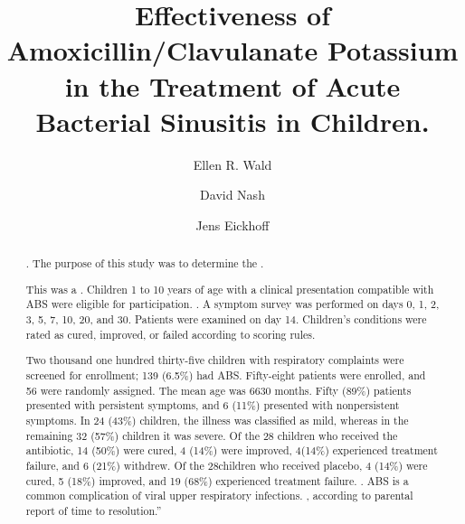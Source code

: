 \documentclass{article}
\title{Effectiveness of Amoxicillin/Clavulanate Potassium in the Treatment of Acute Bacterial Sinusitis in Children.}
\author{Ellen R. Wald \and David Nash \and Jens Eickhoff}
\begin{document}
\maketitle

\begin{abstract}
.
The purpose of this study was to determine the .

This was a .
Children 1 to 10 years of age with a clinical presentation compatible with ABS were eligible for participation.
.
A symptom survey was performed on days 0, 1, 2, 3, 5, 7, 10, 20, and 30.
Patients were examined on day 14.
Children’s conditions were rated as cured, improved, or failed according to scoring rules.

Two thousand one hundred thirty-five children with respiratory complaints were screened for enrollment; 139 (6.5\%) had ABS.
Fifty-eight patients were enrolled, and 56 were randomly assigned. The mean age was 6630 months.
Fifty (89\%) patients presented with persistent symptoms, and 6 (11\%) presented with nonpersistent symptoms.
In 24 (43\%) children, the illness was classified as mild, whereas in the remaining 32 (57\%) children it was severe.
Of the 28 children who received the antibiotic, 14 (50\%) were cured, 4 (14\%) were improved, 4(14\%) experienced treatment failure, and 6 (21\%) withdrew.
Of the 28children who received placebo, 4 (14\%) were cured, 5 (18\%) improved, and 19 (68\%) experienced treatment failure.
.
ABS is a common complication of viral upper respiratory infections. , according to parental report of time to resolution.”
\end{abstract}
\end{document}

